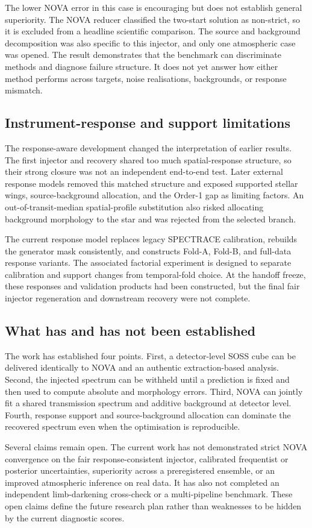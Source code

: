 The lower NOVA error in this case is encouraging but does not establish general
superiority. The NOVA reducer classified the two-start solution as non-strict, so
it is excluded from a headline scientific comparison. The source and background
decomposition was also specific to this injector, and only one atmospheric case
was opened. The result demonstrates that the benchmark can discriminate methods
and diagnose failure structure. It does not yet answer how either method performs
across targets, noise realisations, backgrounds, or response mismatch.

\subsection{Instrument-response and support limitations}

The response-aware development changed the interpretation of earlier results.
The first injector and recovery shared too much spatial-response structure, so
their strong closure was not an independent end-to-end test. Later external
response models removed this matched structure and exposed supported stellar
wings, source-background allocation, and the Order-1 gap as limiting factors.
An out-of-transit-median spatial-profile substitution also risked allocating
background morphology to the star and was rejected from the selected branch.

The current response model replaces legacy SPECTRACE calibration, rebuilds the
generator mask consistently, and constructs Fold-A, Fold-B, and full-data
response variants. The associated factorial experiment is designed to separate
calibration and support changes from temporal-fold choice. At the handoff freeze,
these responses and validation products had been constructed, but the final fair
injector regeneration and downstream recovery were not complete.

\subsection{What has and has not been established}

The work has established four points. First, a detector-level SOSS cube can be
delivered identically to NOVA and an authentic extraction-based analysis. Second,
the injected spectrum can be withheld until a prediction is fixed and then used
to compute absolute and morphology errors. Third, NOVA can jointly fit a shared
transmission spectrum and additive background at detector level. Fourth,
response support and source-background allocation can dominate the recovered
spectrum even when the optimisation is reproducible.

Several claims remain open. The current work has not demonstrated strict NOVA
convergence on the fair response-consistent injector, calibrated frequentist or
posterior uncertainties, superiority across a preregistered ensemble, or an
improved atmospheric inference on real data. It has also not completed an
independent limb-darkening cross-check or a multi-pipeline benchmark. These open
claims define the future research plan rather than weaknesses to be hidden by the
current diagnostic scores.
